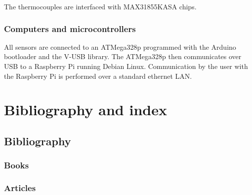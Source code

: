 \documentclass[11pt,fleqn]{book} %
\begin{document}
The thermocouples are interfaced with MAX31855KASA chips.

\section{Computers and microcontrollers}

All sensors are connected to an ATMega328p programmed with the Arduino bootloader and the V-USB library. The ATMega328p then communicates over USB to a Raspberry Pi running Debian Linux. Communication by the user with the Raspberry Pi is performed over a standard ethernet LAN.




\part{Bibliography and index}



\chapter*{Bibliography}
\section*{Books}
\printbibliography[heading=bibempty,type=book]
\section*{Articles}
\printbibliography[heading=bibempty,type=article]


\cleardoublepage
\setlength{\columnsep}{0.75cm}
\printindex

\end{document}
